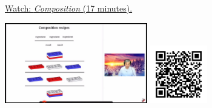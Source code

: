 
\begin{minipage}{10cm}
    \href{https://act4e-spring21.netlify.app/videos/spring2021-intro:composition.html}{Watch: \emph{Composition} (17 minutes).}
        
    \href{https://act4e-spring21.netlify.app/videos/spring2021-intro:composition.html}{\includegraphics[height=3.5cm]{spring2021-intro:composition/thumbnails.jpg}}
    \href{https://act4e-spring21.netlify.app/videos/spring2021-intro:composition.html}{\includegraphics[height=2.5cm]{spring2021-intro:composition/qrcode.png}}
\end{minipage}

